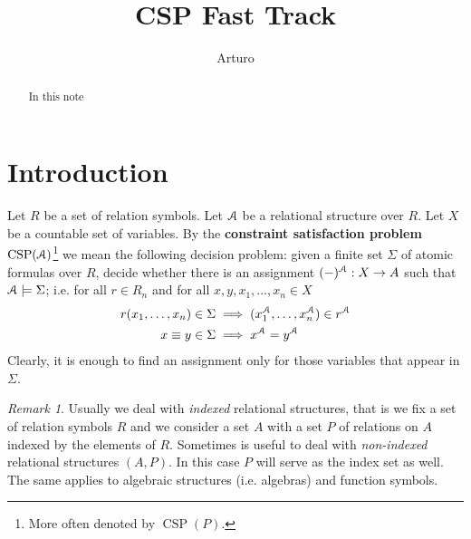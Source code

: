 \documentclass{amsart}
\theoremstyle{plain}
\theoremstyle{definition}
\theoremstyle{remark}
\newtheorem{remark}[theorem]{Remark}
\DeclareMathOperator{\CSP}{CSP}
\begin{document}
\title{CSP Fast Track}
\author{Arturo}


\begin{abstract}
   In this note 
\end{abstract}

\maketitle

\section{Introduction}
Let $R$ be a set of relation symbols. 
Let $\EuScript{A}
$ be a relational structure over $R$.
Let $X$ be a countable set of variables. 
By the \textbf{constraint satisfaction problem} $\CSP(\EuScript{A})$\footnote{More often denoted by $\CSP(P)$.} we mean the following decision problem: 
given a finite set $\Sigma$ of atomic formulas over $R$, decide whether there is 
an assignment $(-)^{\EuScript{A}} : X \to A$ such that 
$\EuScript{A} \models \Sigma$; 
i.e. for all $r \in R_n$ and for all $x,y,x_1, \ldots, x_n \in X$ 
\begin{align}
    r(x_1, \ldots, x_n) \in \Sigma & \implies  (x_1^{{\EuScript{A}}}, \ldots, x_n^{{\EuScript{A}}}) \in r^{\EuScript{A}} \\
    x \equiv y \in \Sigma & \implies x^{{\EuScript{A}}} = y^{{\EuScript{A}}}
\end{align}
Clearly, it is enough to find an assignment only for those variables that appear in $\Sigma$. 

\begin{remark}
    Usually we deal with \emph{indexed} relational structures, 
    that is we fix a set of relation symbols $R$ and we consider a set $A$ with a set $P$ of relations on $A$ indexed by the elements of $R$. 
    Sometimes is useful to deal with \emph{non-indexed} relational structures $(A,P)$. 
    In this case $P$ will serve as the index set as well. 
    The same applies to algebraic structures (i.e. algebras) and function symbols.  
\end{remark}

\end{document}
